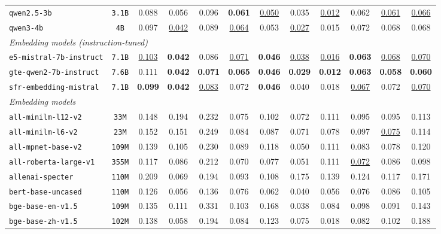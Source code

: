 \documentclass[11pt]{article}
\begin{document}
\begin{table}[htbp]
{\begin{tabular}{lccccccccccc}
\texttt{qwen2.5-3b} & \texttt{3.1B} & 0.088 & 0.056 & 0.096 & \textbf{0.061} & \underline{0.050} & 0.035 & \underline{0.012} & 0.062 & \underline{0.061} & \underline{0.066} \\
\texttt{qwen3-4b} & \texttt{4B} & 0.097 & \underline{0.042} & 0.089 & \underline{0.064} & 0.053 & \underline{0.027} & 0.015 & 0.072 & 0.068 & 0.068 \\
\midrule
\multicolumn{12}{l}{\textit{Embedding models (instruction-tuned)}} \\
\midrule
\texttt{e5-mistral-7b-instruct} & \texttt{7.1B} & \underline{0.103} & \textbf{0.042} & 0.086 & \underline{0.071} & \textbf{0.046} & \underline{0.038} & \underline{0.016} & \textbf{0.063} & \underline{0.068} & \underline{0.070} \\
\texttt{gte-qwen2-7b-instruct} & \texttt{7.6B} & 0.111 & \textbf{0.042} & \textbf{0.071} & \textbf{0.065} & \textbf{0.046} & \textbf{0.029} & \textbf{0.012} & \textbf{0.063} & \textbf{0.058} & \textbf{0.060} \\
\texttt{sfr-embedding-mistral} & \texttt{7.1B} & \textbf{0.099} & \textbf{0.042} & \underline{0.083} & 0.072 & \textbf{0.046} & 0.040 & 0.018 & \underline{0.067} & 0.072 & \underline{0.070} \\
\midrule
\multicolumn{12}{l}{\textit{Embedding models}} \\
\midrule
\texttt{all-minilm-l12-v2} & \texttt{33M} & 0.148 & 0.194 & 0.232 & 0.075 & 0.102 & 0.072 & 0.111 & 0.095 & 0.095 & 0.113 \\
\texttt{all-minilm-l6-v2} & \texttt{23M} & 0.152 & 0.151 & 0.249 & 0.084 & 0.087 & 0.071 & 0.078 & 0.097 & \underline{0.075} & 0.114 \\
\texttt{all-mpnet-base-v2} & \texttt{109M} & 0.139 & 0.105 & 0.230 & 0.089 & 0.118 & 0.050 & 0.111 & 0.083 & 0.078 & 0.120 \\
\texttt{all-roberta-large-v1} & \texttt{355M} & 0.117 & 0.086 & 0.212 & 0.070 & 0.077 & 0.051 & 0.111 & \underline{0.072} & 0.086 & 0.098 \\
\texttt{allenai-specter} & \texttt{110M} & 0.209 & 0.069 & 0.194 & 0.093 & 0.108 & 0.175 & 0.139 & 0.124 & 0.117 & 0.171 \\
\texttt{bert-base-uncased} & \texttt{110M} & 0.126 & 0.056 & 0.136 & 0.076 & 0.062 & 0.040 & 0.056 & 0.076 & 0.086 & 0.105 \\
\texttt{bge-base-en-v1.5} & \texttt{109M} & 0.135 & 0.111 & 0.331 & 0.103 & 0.168 & 0.038 & 0.084 & 0.098 & 0.091 & 0.143 \\
\texttt{bge-base-zh-v1.5} & \texttt{102M} & 0.138 & 0.058 & 0.194 & 0.084 & 0.123 & 0.075 & 0.018 & 0.082 & 0.102 & 0.188 \\

\end{tabular}}
\end{table}
\end{document}
